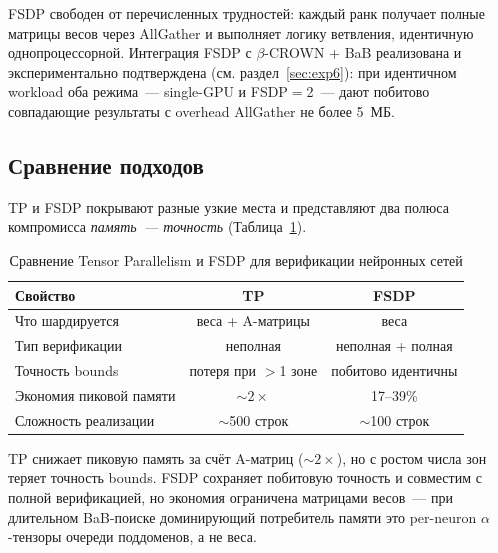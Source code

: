 FSDP свободен от перечисленных трудностей: каждый ранк получает
полные матрицы весов через AllGather и выполняет логику ветвления,
идентичную однопроцессорной.
Интеграция FSDP с $\beta$-CROWN + BaB реализована и экспериментально
подтверждена (см. раздел~\ref{sec:exp6}): при идентичном workload
оба режима~--- single-GPU и FSDP$=$2~--- дают побитово совпадающие
результаты с overhead AllGather не более 5~МБ.

\subsection{Сравнение подходов}

TP и FSDP покрывают разные узкие места и представляют два полюса
компромисса \textit{память~--- точность}
(Таблица~\ref{tab:parallelism-comparison}).

\begin{table}[htbp]
\centering
\caption{Сравнение Tensor Parallelism и FSDP для верификации нейронных сетей}
\label{tab:parallelism-comparison}
\begin{tabular}{lcc}
\toprule
Свойство & TP & FSDP \\
\midrule
Что шардируется & веса + A-матрицы & веса \\
Тип верификации & неполная & неполная + полная \\
Точность bounds & потеря при $>$1 зоне & побитово идентичны \\
Экономия пиковой памяти & $\sim\!2\times$ & 17--39\% \\
Сложность реализации & $\sim$500 строк & $\sim$100 строк \\
\bottomrule
\end{tabular}
\end{table}

TP снижает пиковую память за счёт A-матриц ($\sim\!2\times$),
но с ростом числа зон теряет точность bounds.
FSDP сохраняет побитовую точность и совместим с полной верификацией,
но экономия ограничена матрицами весов~--- при длительном
BaB-поиске доминирующий потребитель памяти это per-neuron
$\alpha$-тензоры очереди поддоменов, а не веса.
